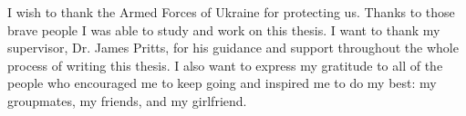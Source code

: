 \documentclass[
11pt, %
english, %
singlespacing, %
headsepline, %
openany
]{MastersDoctoralThesis} %
\begin{document}

\begin{acknowledgements}
	\addchaptertocentry{\acknowledgementname} %
	I wish to thank the Armed Forces of Ukraine for protecting us. Thanks to those
	brave people I was able to study and work on this thesis. I want to thank my
	supervisor, Dr. James Pritts, for his guidance and support throughout the whole
	process of writing this thesis. I also want to express my gratitude to all of
	the people who encouraged me to keep going and inspired me to do my best: my
	groupmates, my friends, and my girlfriend.

\end{acknowledgements}


\tableofcontents %
%
%


%
%

\end{document}
